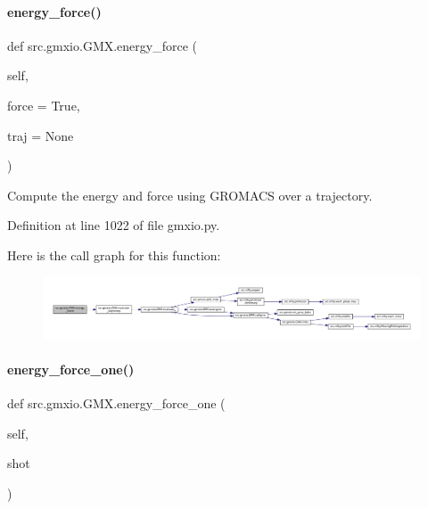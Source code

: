 \paragraph{\texorpdfstring{energy\+\_\+force()}{energy\_force()}}
{\footnotesize\ttfamily def src.\+gmxio.\+G\+M\+X.\+energy\+\_\+force (\begin{DoxyParamCaption}\item[{}]{self,  }\item[{}]{force = {\ttfamily True},  }\item[{}]{traj = {\ttfamily None} }\end{DoxyParamCaption})}



Compute the energy and force using G\+R\+O\+M\+A\+CS over a trajectory. 



Definition at line 1022 of file gmxio.\+py.

Here is the call graph for this function\+:
\nopagebreak
\begin{figure}[H]
\begin{center}
\leavevmode
\includegraphics[width=350pt]{classsrc_1_1gmxio_1_1GMX_afc3071aab6e7a737e0baada5f9b1f292_cgraph}
\end{center}
\end{figure}
\mbox{\label{classsrc_1_1gmxio_1_1GMX_a1d9129c7e9e4e081ee985256338ec663}} 
\paragraph{\texorpdfstring{energy\+\_\+force\+\_\+one()}{energy\_force\_one()}}
{\footnotesize\ttfamily def src.\+gmxio.\+G\+M\+X.\+energy\+\_\+force\+\_\+one (\begin{DoxyParamCaption}\item[{}]{self,  }\item[{}]{shot }\end{DoxyParamCaption})}



